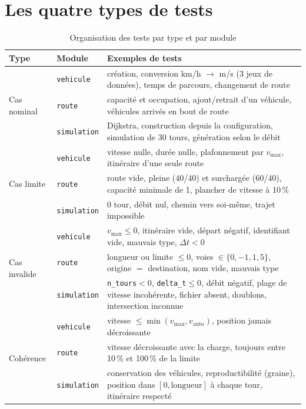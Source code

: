 \documentclass[12pt,a4paper]{report}
\begin{document}
\section{Les quatre types de tests}
\begin{table}[H]\centering\small
\begin{tabular}{@{}p{2.4cm} p{3.2cm} p{8.3cm}@{}}
\toprule
\textbf{Type} & \textbf{Module} & \textbf{Exemples de tests} \\ \midrule
\multirow{3}{*}{Cas nominal}
 & \texttt{vehicule} & création, conversion km/h $\to$ m/s (3 jeux de données), temps de parcours, changement de route \\
 & \texttt{route} & capacité et occupation, ajout/retrait d'un véhicule, véhicules arrivés en bout de route \\
 & \texttt{simulation} & Dijkstra, construction depuis la configuration, simulation de 30 tours, génération selon le débit \\ \midrule
\multirow{3}{*}{Cas limite}
 & \texttt{vehicule} & vitesse nulle, durée nulle, plafonnement par $v_{\max}$, itinéraire d'une seule route \\
 & \texttt{route} & route vide, pleine (40/40) et surchargée (60/40), capacité minimale de 1, plancher de vitesse à 10\,\% \\
 & \texttt{simulation} & 0 tour, débit nul, chemin vers soi-même, trajet impossible \\ \midrule
\multirow{3}{*}{Cas invalide}
 & \texttt{vehicule} & $v_{\max}\le 0$, itinéraire vide, départ négatif, identifiant vide, mauvais type, $\Delta t<0$ \\
 & \texttt{route} & longueur ou limite $\le 0$, voies $\in\{0,-1,1{,}5\}$, origine $=$ destination, nom vide, mauvais type \\
 & \texttt{simulation} & \texttt{n\_\allowbreak{}tours}$<0$, \texttt{delta\_\allowbreak{}t}$\le 0$, débit négatif, plage de vitesse incohérente, fichier absent, doublons, intersection inconnue \\ \midrule
\multirow{3}{*}{Cohérence}
 & \texttt{vehicule} & vitesse $\le\min(v_{\max}, v_{\text{auto}})$, position jamais décroissante \\
 & \texttt{route} & vitesse décroissante avec la charge, toujours entre 10\,\% et 100\,\% de la limite \\
 & \texttt{simulation} & conservation des véhicules, reproductibilité (graine), position dans $[0,\text{longueur}]$ à chaque tour, itinéraire respecté \\ \bottomrule
\end{tabular}
\caption{Organisation des tests par type et par module}
\end{table}
\end{document}
